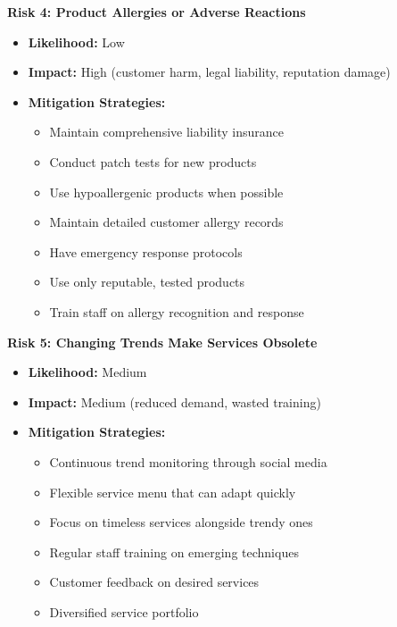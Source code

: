 \textbf{Risk 4: Product Allergies or Adverse Reactions}
\begin{itemize}[leftmargin=2em]
    \item \textbf{Likelihood:} Low
    \item \textbf{Impact:} High (customer harm, legal liability, reputation damage)
    \item \textbf{Mitigation Strategies:}
    \begin{itemize}
        \item Maintain comprehensive liability insurance
        \item Conduct patch tests for new products
        \item Use hypoallergenic products when possible
        \item Maintain detailed customer allergy records
        \item Have emergency response protocols
        \item Use only reputable, tested products
        \item Train staff on allergy recognition and response
    \end{itemize}
\end{itemize}

\textbf{Risk 5: Changing Trends Make Services Obsolete}
\begin{itemize}[leftmargin=2em]
    \item \textbf{Likelihood:} Medium
    \item \textbf{Impact:} Medium (reduced demand, wasted training)
    \item \textbf{Mitigation Strategies:}
    \begin{itemize}
        \item Continuous trend monitoring through social media
        \item Flexible service menu that can adapt quickly
        \item Focus on timeless services alongside trendy ones
        \item Regular staff training on emerging techniques
        \item Customer feedback on desired services
        \item Diversified service portfolio
    \end{itemize}
\end{itemize}

